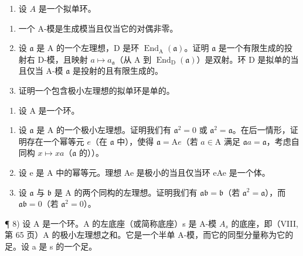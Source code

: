 \begin{enumerate}
\def\labelenumi{\arabic{enumi})}
\setcounter{enumi}{5}
\tightlist
\item
  设 \(A\) 是一个拟单环。
\end{enumerate}

\begin{enumerate}
\def\labelenumi{\alph{enumi})}
\item
  一个 A-模是生成模当且仅当它的对偶非零。
\item
  设 \(\mathfrak{a}\) 是 A 的一个左理想，D 是环 \(\operatorname{End}_{\mathrm{A}}(\mathfrak{a})\)。证明 \(\mathfrak{a}\) 是一个有限生成的投射右 D-模，且映射 \(a \mapsto a_{\mathfrak{a}}\)（从 A 到 \(\operatorname{End}_{\mathrm{D}}(\mathfrak{a})\)）是双射。环 D 是拟单的当且仅当 A-模 \(\mathfrak{a}\) 是投射的且有限生成的。
\item
  证明一个包含极小左理想的拟单环是单的。
\end{enumerate}

\begin{enumerate}
\def\labelenumi{\arabic{enumi})}
\setcounter{enumi}{6}
\tightlist
\item
  设 A 是一个环。
\end{enumerate}

\begin{enumerate}
\def\labelenumi{\alph{enumi})}
\item
  设 \(\mathfrak{a}\) 是 A 的一个极小左理想。证明我们有 \(\mathfrak{a}^2 = 0\) 或 \(\mathfrak{a}^2 = \mathfrak{a}\)。在后一情形，证明存在一个幂等元 \(e\)（在 \(\mathfrak{a}\) 中），使得 \(\mathfrak{a} = \mathrm{A}e\)（若 \(a \in \mathrm{A}\) 满足 \(\mathfrak{a}a = \mathfrak{a}\)，考虑自同构 \(x \mapsto xa\)（\(\mathfrak{a}\) 的））。
\item
  设 e 是 A 中的幂等元。理想 Ae 是极小的当且仅当环 eAe 是一个体。
\item
  设 \(\mathfrak{a}\) 与 \(\mathfrak{b}\) 是 A 的两个同构的左理想。证明我们有 \(\mathfrak{ab} = \mathfrak{b}\)（若 \(\mathfrak{a}^2 = \mathfrak{a}\)），而 \(\mathfrak{ab} = 0\)（若 \(\mathfrak{a}^2 = 0\)）。
\end{enumerate}

¶ 8) 设 A 是一个环。A 的左底座（或简称底座）s 是 A-模 \(A_{s}\) 的底座，即（VIII, 第 65 页）A 的极小左理想之和。它是一个半单 A-模，而它的同型分量称为它的足。设 a 是 s 的一个足。

